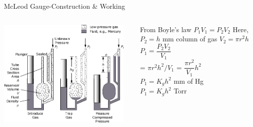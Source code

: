 \documentclass[11pt]{beamer}
\begin{document}
\begin{frame}{McLeod Gauge-Construction \& Working }

\begin{columns}[t]

       \begin{exampleblock}{}
          \begin{center}
			\includegraphics[width=0.95\textwidth]{McLeod.png}
		\end{center}
       \end{exampleblock}
       
       \begin{exampleblock}{ }
          From Boyle’s law   $P_{1}V_{1}=P_{2}V_{2} $
Here, $P_{2}=h$ mm column of gas
$V_{2}= \pi r^2 h$ \\
$P_{1}= \dfrac{P_{2}V_{2}}{V_{1}} $\\
= $\pi r^{2}h^{2}/V_{1} $ = $\dfrac{\pi r^{2}}{V_{1}}h^{2}$\\
$P_{1}=K_{g}h^{2}$ mm of Hg \\
 $P_{1}=K_{g}h^{2}$ Torr
       
       \end{exampleblock}   
   
    \end{columns}   



\end{frame}
\end{document}
